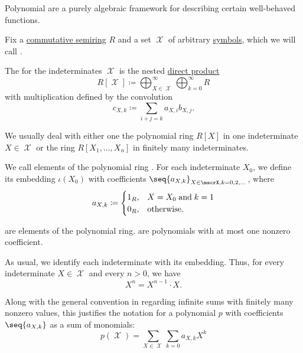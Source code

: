 \begin{definition}\label{def:polynomial_semiring}
  Polynomial are a purely algebraic framework for describing certain well-behaved functions.

  Fix a \hyperref[def:semiring/commutative]{commutative semiring} \( R \) and a set \( \mscrX \) of arbitrary \hyperref[def:formal_language/symbol]{symbols}, which we will call .

  The  for the indeterminates \( \mscrX \) is the nested \hyperref[def:semimodule_direct_product]{direct product}
  \begin{equation*}
    R[\mscrX] \coloneqq \bigoplus_{X \in \mscrX}^\infty \bigoplus_{k=0}^\infty R
  \end{equation*}
  with multiplication defined by the convolution
  \begin{equation*}
    c_{X,k} \coloneqq \sum_{i+j=k} a_{X,i} b_{X,j}.
  \end{equation*}

  We usually deal with either one the polynomial ring \( R[X] \) in one indeterminate \( X \in \mscrX \) or the ring \( R[X_1, \ldots, X_n] \) in finitely many indeterminates.

  We call elements of the polynomial ring . For each indeterminate \( X_0 \), we define its embedding \( \iota(X_0) \) with coefficients \( \seq{ a_{X,k} }_{X \in \mscrX,k=0,2,\ldots} \), where
  \begin{equation*}
    a_{X,k} \coloneqq \begin{cases}
      1_R, &X = X_0 \T{and} k = 1 \\
      0_R, &\T{otherwise.}
    \end{cases}
  \end{equation*}

   are elements of the polynomial ring.  are polynomials with at most one nonzero coefficient.

  As usual, we identify each indeterminate with its embedding. Thus, for every indeterminate \( X \in \mscrX \) and every \( n > 0 \), we have
  \begin{equation*}
    X^n = X^{n-1} \cdot X.
  \end{equation*}

  Along with the general convention in  regarding infinite sums with finitely many nonzero values, this justifies the notation for a polynomial \( p \) with coefficients \( \seq{ a_{X,k} } \) as a sum of monomials:
  \begin{equation}\label{eq:def:polynomial_semiring/form}
    p(\mscrX) = \sum_{X \in \mscrX} \sum_{k=0} a_{X,k} X^k
  \end{equation}
\end{definition}

